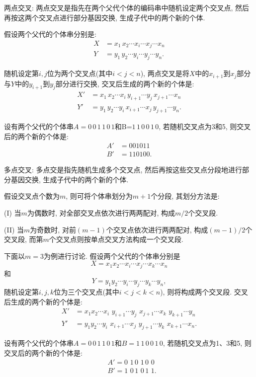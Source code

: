     两点交叉: 两点交叉是指先在两个父代个体的编码串中随机设定两个交叉点, 然后再按这两个交叉点进行部分基因交换, 生成子代中的两个新的个体.

假设两个父代的个体串分别是:
\begin{align*}
    X&=x_1\, x_2 \cdots x_i \cdots x_j \cdots x_n\\
    Y&=y_1\, y_2 \cdots y_i \cdots y_j \cdots y_n.
\end{align*}

随机设定第$i,j$位为两个交叉点(其中$i<j<n$), 两点交叉是将$X$中的$x_{i+1}$到$x_j$部分与$Y$中的$y_{i+1}$到$y_j$部分进行交换, 交叉后生成的两个新的个体是:
\begin{align*}
    X'&= x_1\, x_2 \cdots x_i\, y_{i+1} \cdots y_j\, x_{j+1} \cdots x_n\\
    Y'&= y_1\, y_2  \cdots y_i\, x_{i+1} \cdots x_j\, y_{j+1} \cdots y_n.
\end{align*}

\begin{example}
设有两个父代的个体串$A= 0\, 0\,  1\,  1\,  0\,  1$和B=$1\,  1\,  0\,  0\,  1\,  0$, 若随机交叉点为3和5, 则交叉后的两个新的个体是:
\begin{align*}
     A'&= 0 0 1 0 1 1\\
    B'&= 1 1 0 1 0 0.
\end{align*}
\vspace{-0.4cm}
\end{example}

     多点交叉: 多点交是指先随机生成多个交叉点, 然后再按这些交叉点分段地进行部分基因交换, 生成子代中的两个新的个体.

假设交叉点个数为$m$, 则可将个体串划分为$m+1$个分段, 其划分方法是:

\qquad (I) 当$m$为偶数时, 对全部交叉点依次进行两两配对, 构成$m/2$个交叉段.

\qquad (II) 当$m$为奇数时, 对前$(m-1)$个交叉点依次进行两两配对, 构成$(m-1)/2$个交叉段, 而第$m$个交叉点则按单点交叉方法构成一个交叉段.

下面以$m=3$为例进行讨论.
假设两个父代的个体串分别是$$X=x_1 x_2 \cdots x_i \cdots x_j \cdots x_k \cdots x_n$$和$$Y=y_1 y_2 \cdots y_i \cdots y_j \cdots y_k \cdots y_n,$$
随机设定第$i,j,k$位为三个交叉点(其中$i<j<k<n$), 则将构成两个交叉段. 交叉后生成的两个新的个体是:
\begin{align*}
  X'&= x_1 x_2 \cdots x_i  \,\,y_{i+1} \cdots y_j \,\,x_{j+1} \cdots x_k \,\,y_{k+1} \cdots y_n\\
  Y'&= y_1 y_2 \cdots y_i\,\, x_{i+1} \cdots x_j\,\, y_{j+1} \cdots y_k \,\,x_{k+1} \cdots x_n.
\end{align*}
\begin{example}
设有两个父代的个体串$A= 0\, 0\, 1\, 1\, 0\, 1$和$B= 1\, 1\, 0\, 0\, 1\, 0$, 若随机交叉点为1、3和5, 则交叉后的两个新的个体是:
\begin{align*}
    &A'= 0\,\, 1\, 0\,\, 1\, 0\,\, 0\\
    &B'= 1\,\, 0\, 1\,\, 0\, 1\,\, 1.
\end{align*}
\vspace{-0.4cm}
\end{example}

